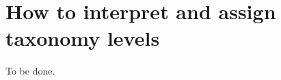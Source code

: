 \section{How to interpret and assign taxonomy levels}
\label{sec:how_to_interpret_and_assign_taxonomy_levels}

To be done.

